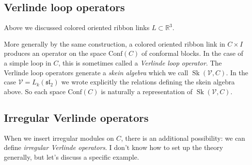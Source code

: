 \documentclass[12pt,letterpaper,reqno]{amsart}
\numberwithin{equation}{section}
\newcommand{\fsl}{{\mathfrak {sl}}}
\newcommand{\bbR}{\ensuremath{\mathbb R}}
\newcommand{\vertex}{\mathcal{V}}
\newcommand{\Conf}{\textrm{Conf}}
\newcommand{\ti}[1]{\textit{#1}}
\DeclareMathOperator{\Sk}{Sk}
\begin{document}
\subsection{Verlinde loop operators}

Above we discussed colored oriented ribbon links $L \subset \bbR^3$.

More generally by the same construction, a colored oriented ribbon link
in $C \times I$ produces an operator on the space $\Conf(C)$ of conformal blocks. In the case
of a simple loop in $C$, this is sometimes called a \ti{Verlinde loop operator}.
The Verlinde loop operators generate a \ti{skein algebra} which we call $\Sk(\vertex, C)$.
In the case $\vertex = L_k(\fsl_2)$ we wrote explicitly the relations defining the skein 
algebra above.
So each space $\Conf(C)$ is naturally a representation of $\Sk(\vertex,C)$.



\subsection{Irregular Verlinde operators}

When we insert irregular modules on $C$, there is an additional possibility:
we can define \ti{irregular Verlinde operators}. I don't know how to set
up the theory generally, but let's discuss a specific example.
\end{document}
